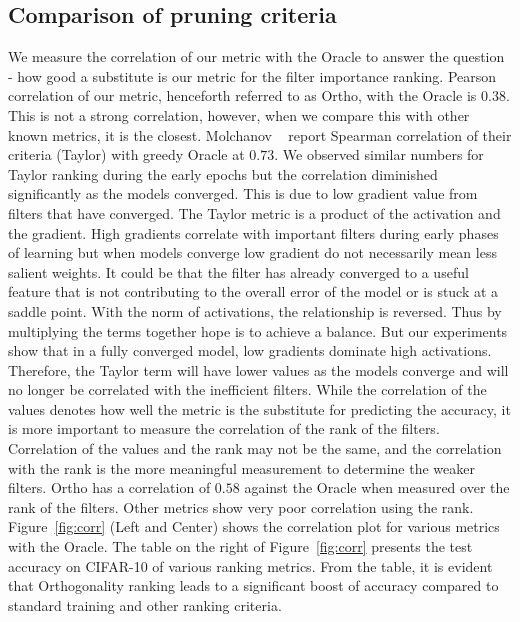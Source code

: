 \subsection{Comparison of pruning criteria }
We measure the correlation of our metric with the Oracle to answer the question - how good a substitute is our metric for the filter importance ranking. 
Pearson correlation of our metric, henceforth referred to as Ortho, with the Oracle is $0.38$. 
This is not a strong correlation, however, when we compare this with other known metrics, it is the closest.
Molchanov \etal ~\cite{Molchanov2016PruningCN} report Spearman correlation of their criteria (Taylor) with greedy Oracle at $0.73$. 
We observed similar numbers for Taylor ranking during the early epochs but the correlation diminished significantly as the models converged.
This is due to low gradient value from filters that have converged.
The Taylor metric is a product of the activation and the gradient. 
High gradients correlate with important filters during early phases of learning but when models converge low gradient do not necessarily mean less salient weights.
It could be that the filter has already converged to a useful feature that is not contributing to the overall error of the model or is stuck at a saddle point.
With the norm of activations, the relationship is reversed. 
Thus by multiplying the terms together hope is to achieve a balance. 
But our experiments show that in a fully converged model, low gradients dominate high activations.
Therefore, the Taylor term will have lower values as the models converge and will no longer be correlated with the inefficient filters.
While the correlation of the values denotes how well the metric is the substitute for predicting the accuracy, it is more important to measure the correlation of the rank of the filters.
Correlation of the values and the rank may not be the same, and the correlation with the rank is the more meaningful measurement to determine the weaker filters.
Ortho has a correlation of $0.58$ against the Oracle when measured over the rank of the filters. 
Other metrics show very poor correlation using the rank. Figure~\ref{fig:corr} (Left and Center) shows the correlation plot for various metrics with the Oracle.
The table on the right of Figure~\ref{fig:corr} presents the test accuracy on CIFAR-10 of various ranking metrics.
From the table, it is evident that Orthogonality ranking leads to a significant boost of accuracy compared to standard training and other ranking criteria.

